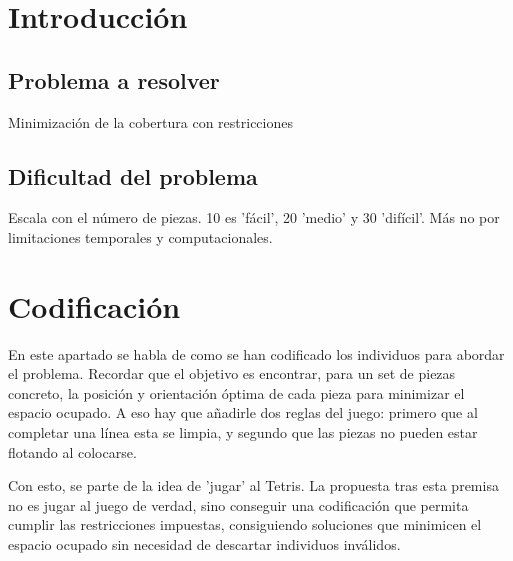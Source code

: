 \documentclass[11pt,spanish,listoffigures,listoftables]{tfgetsinf}
\begin{document}


\chapter{Introducción}

\section{Problema a resolver}
Minimización de la cobertura con restricciones 

\section{Dificultad del problema}
Escala con el número de piezas. 10 es 'fácil', 20 'medio' y 30 'difícil'. Más no por limitaciones temporales y computacionales.

\mainmatter
\chapter{Codificación}
En este apartado se habla de como se han codificado los individuos para abordar el problema. Recordar que el objetivo es encontrar, para un set de piezas concreto, la posición y orientación óptima de cada pieza para minimizar el espacio ocupado. A eso hay que añadirle dos reglas del juego: primero que al completar una línea esta se limpia, y segundo que las piezas no pueden estar flotando al colocarse.

Con esto, se parte de la idea de 'jugar' al Tetris. La propuesta tras esta premisa no es jugar al juego de verdad, sino conseguir una codificación que permita cumplir las restricciones impuestas, consiguiendo soluciones que minimicen el espacio ocupado sin necesidad de descartar individuos inválidos. 
\end{document}
